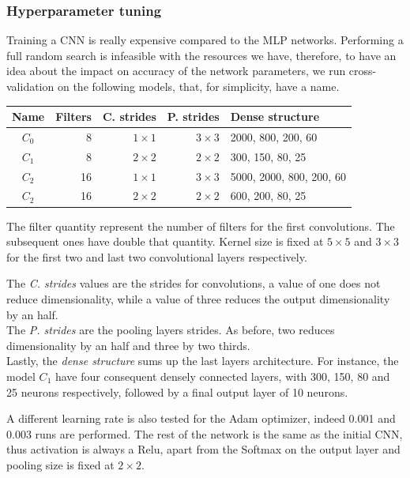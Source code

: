 \subsubsection{Hyperparameter tuning}
Training a CNN is really expensive compared to the MLP networks.
Performing a full random search is infeasible with the resources we have, therefore, 
to have an idea about the impact on accuracy of the network parameters, we run 
cross-validation on the following models, that, for simplicity, have a name.
\begin{center}
    \begin{tabular}{ |c|r|r|r|l| } 
        \hline
        Name & Filters & C. strides & P. strides & Dense structure \\
        \hline
        $C_0$ & 8 &  $1 \times 1$ & $3 \times 3$ & 2000, 800, 200, 60 \\
        $C_1$ & 8 &  $2 \times 2$ & $2 \times 2$ & 300, 150, 80, 25 \\
        $C_2$ & 16 & $1 \times 1$ & $3 \times 3$ & 5000, 2000, 800, 200, 60 \\
        $C_2$ & 16 & $2 \times 2$ & $2 \times 2$ & 600, 200, 80, 25 \\
        \hline
    \end{tabular}
\end{center}

The filter quantity represent the number of filters for the first convolutions. 
The subsequent ones have double that quantity.
Kernel size is fixed at $5 \times 5$ and $3 \times 3$ for the first two and last 
two convolutional layers respectively. 

The \emph{C. strides} values are the strides for convolutions, a value of one does not 
reduce dimensionality, while a value of three reduces the output dimensionality by an  half.\\
The \emph{P. strides} are the pooling layers strides. As before, two reduces dimensionality 
by an half and three by two thirds.\\
Lastly, the \emph{dense structure} sums up the last layers architecture. For instance, 
the model $C_1$ have four consequent densely connected layers, with 300, 150, 80 and 
25 neurons respectively, followed by a final output layer of 10 neurons.

A different learning rate is also tested for the Adam optimizer, 
indeed 0.001 and 0.003 runs are performed.
The rest of the network is the same as the initial CNN, thus activation is always a Relu, 
apart from the Softmax on the output layer and pooling size is fixed at $2 \times 2$.

